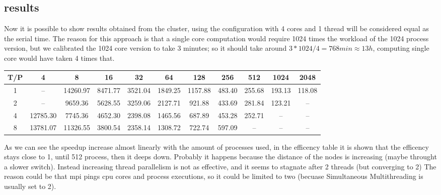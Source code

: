 \documentclass[10pt]{article}
\begin{document}
\begin{multicols}{2}
\subsection*{results}
\label{results}
Now it is possible to show results obtained from the cluster,
using the configuration with 4 cores and 1 thread will be considered
equal as the serial time. The reason for this approach is that a single core computation would require 1024 times the workload of the 1024 process version, but we calibrated the 1024 core version to take 3 minutes;
so it should take around $3*1024/4=768min \approx 13h $, computing single core would have taken 4 times that.
\begin{table}[H]
\centering
\tiny  %
\setlength{\tabcolsep}{3pt}  %
\begin{tabular}{|c|*{10}{c}|}
  \hline
  T/P & 4 & 8 & 16 & 32 & 64 & 128 & 256 & 512 & 1024 & 2048 \\
  \hline
  1 & -- & 14260.97 & 8471.77 & 3521.04 & 1849.25 & 1157.88 & 483.40 & 255.68 & 193.13 & 118.08 \\
  2 & -- & 9659.36 & 5628.55 & 3259.06 & 2127.71 & 921.88 & 433.69 & 281.84 & 123.21 & -- \\
  4 & 12785.30 & 7745.36 & 4652.30 & 2398.08 & 1465.56 & 687.89 & 453.28 & 252.71 & -- & -- \\
  8 & 13781.07 & 11326.55 & 3800.54 & 2358.14 & 1308.72 & 722.74 & 597.09 & -- & -- & -- \\
  \hline
\end{tabular}
\end{table}





As we can see the speedup increase almost linearly with the amount of processes used, in the efficency table it is shown that the efficency stays close to 1, until 512 process, then it deeps down. Probably it happens because the distance of the nodes is increasing (maybe throught a slower switch).
Instead increasing thread parallelism is not as effective, and it seems to stagnate after 2 threads (but converging to 2)
The reason could be that mpi pings cpu cores and process executions, so it could be limited to two (becuase Simultaneous Multithreading is usually set to 2).




\end{multicols}
\end{document}
